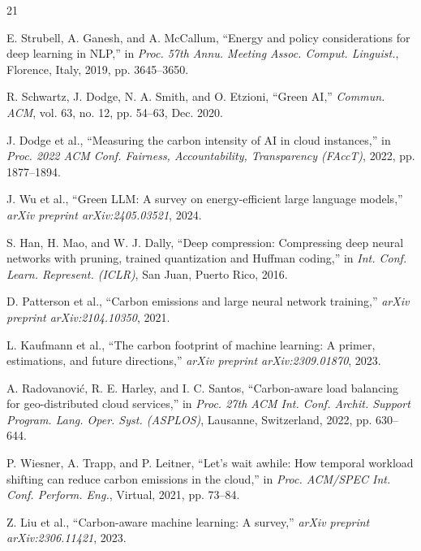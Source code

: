 \documentclass[journal]{IEEEtran}
\begin{document}
\balance

\begin{thebibliography}{21}

E. Strubell, A. Ganesh, and A. McCallum, ``Energy and policy considerations
for deep learning in NLP,'' in \textit{Proc. 57th Annu. Meeting Assoc.
Comput. Linguist.}, Florence, Italy, 2019, pp. 3645--3650.

R. Schwartz, J. Dodge, N. A. Smith, and O. Etzioni, ``Green AI,''
\textit{Commun. ACM}, vol. 63, no. 12, pp. 54--63, Dec. 2020.

J. Dodge et al., ``Measuring the carbon intensity of AI in cloud instances,''
in \textit{Proc. 2022 ACM Conf. Fairness, Accountability, Transparency
(FAccT)}, 2022, pp. 1877--1894.

J. Wu et al., ``Green LLM: A survey on energy-efficient large language
models,'' \textit{arXiv preprint arXiv:2405.03521}, 2024.

S. Han, H. Mao, and W. J. Dally, ``Deep compression: Compressing deep neural
networks with pruning, trained quantization and Huffman coding,'' in
\textit{Int. Conf. Learn. Represent. (ICLR)}, San Juan, Puerto Rico, 2016.

D. Patterson et al., ``Carbon emissions and large neural network training,''
\textit{arXiv preprint arXiv:2104.10350}, 2021.

L. Kaufmann et al., ``The carbon footprint of machine learning: A primer,
estimations, and future directions,'' \textit{arXiv preprint
arXiv:2309.01870}, 2023.

A. Radovanovi\'c, R. E. Harley, and I. C. Santos, ``Carbon-aware load
balancing for geo-distributed cloud services,'' in \textit{Proc. 27th ACM
Int. Conf. Archit. Support Program. Lang. Oper. Syst. (ASPLOS)}, Lausanne,
Switzerland, 2022, pp. 630--644.

P. Wiesner, A. Trapp, and P. Leitner, ``Let's wait awhile: How temporal
workload shifting can reduce carbon emissions in the cloud,'' in \textit{Proc.
ACM/SPEC Int. Conf. Perform. Eng.}, Virtual, 2021, pp. 73--84.

Z. Liu et al., ``Carbon-aware machine learning: A survey,''
\textit{arXiv preprint arXiv:2306.11421}, 2023.


\end{thebibliography}
\end{document}
